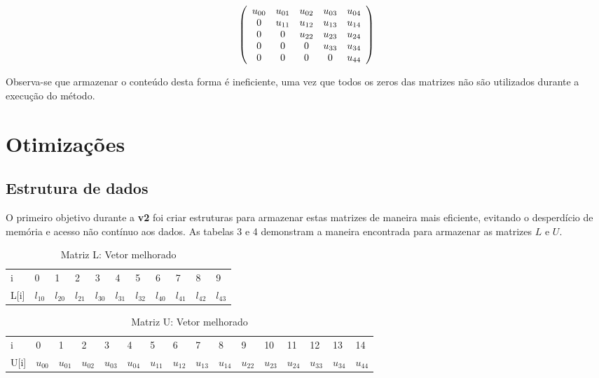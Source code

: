 \documentclass[12pt]{article}
\begin{document}
$$ \left(
  \begin{array}{c c c c c}
     u_{00}  & u_{01}    & u_{02} & u_{03}  & u_{04}\\
     0       & u_{11}    & u_{12} & u_{13}  & u_{14}\\
     0       & 0         & u_{22} & u_{23}  & u_{24}\\
     0       & 0         & 0      & u_{33}  & u_{34}\\
     0       & 0         & 0      & 0       & u_{44} \\
  \end{array} \right)
$$

Observa-se que armazenar o conteúdo desta forma é ineficiente, uma vez que todos os zeros das matrizes não são utilizados durante a execução do método.

\section{Otimizações}
\subsection{Estrutura de dados}
O primeiro objetivo durante a \textbf{v2} foi criar estruturas para armazenar estas matrizes de maneira mais eficiente, evitando o desperdício de memória e acesso não contínuo aos dados. As tabelas 3 e 4 demonstram a maneira encontrada para armazenar as matrizes $L$ e $U$.

\begin{table}[H]
\centering
\caption{Matriz L: Vetor melhorado}
\label{my-label}
\begin{tabular}{l|l|l|l|l|l|l|l|l|l|l|}
\cline{2-11}
i   & 0      & 1      & 2      & 3      & 4      & 5      & 6      & 7      & 8      & 9   \\ \cline{2-11}
L[i] & $l_{10}$ & $l_{20}$ & $l_{21}$ & $l_{30}$ & $l_{31}$ & $l_{32}$ & $l_{40}$ & $l_{41}$ & $l_{42}$ & $l_{43}$ \\ \cline{2-11}
\end{tabular}
\end{table}

\begin{table}[H]
\caption{Matriz U: Vetor melhorado}
\label{my-label}
\begin{tabular}{l|l|l|l|l|l|l|l|l|l|l|l|l|l|l|l|}
\cline{2-16}
i   & 0      & 1      & 2      & 3      & 4      & 5      & 6      & 7      & 8      & 9   & 10  & 11  & 12  & 13  & 14 \\ \cline{2-16}
U[i] & $u_{00}$ & $u_{01}$ & $u_{02}$ & $u_{03}$ & $u_{04}$ & $u_{11}$ & $u_{12}$ & $u_{13}$ & $u_{14}$ & $u_{22}$ & $u_{23}$ & $u_{24}$ & $u_{33}$ & $u_{34}$ & $u_{44}$ \\ \cline{2-16}
\end{tabular}
\end{table}
\end{document}

